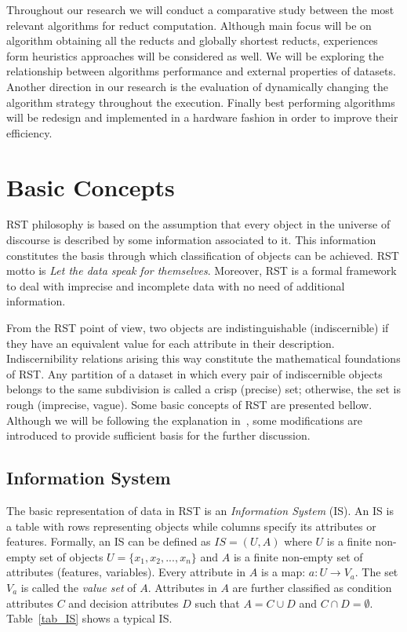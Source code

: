 \documentclass[authoryear,11pt]{elsarticle}
\begin{document}
  Throughout our research we will conduct a comparative study between the most relevant algorithms for reduct 
  computation. Although main focus will be on algorithm obtaining all the reducts and globally shortest reducts,
  experiences form heuristics approaches will be considered as well. We will be exploring the relationship 
  between algorithms performance and external properties of datasets. Another direction in our research is
  the evaluation of dynamically changing the algorithm strategy throughout the execution. Finally best
  performing algorithms will be redesign and implemented in a hardware fashion in order to improve their
  efficiency.  

\section{Basic Concepts}\label{basicConcepts}
  RST philosophy is based on the assumption that every object in the universe of discourse is described by 
  some information associated to it. This information constitutes the basis through which classification of 
  objects can be achieved. RST motto is \textit{Let the data speak for themselves}. Moreover, RST is a formal 
  framework to deal with imprecise and incomplete data with no need of additional information.
  
  From the RST point of view, two objects are indistinguishable (indiscernible) if they have an equivalent 
  value for each attribute in their description. Indiscernibility relations arising this way constitute the
  mathematical foundations of RST. Any partition of a dataset in which every pair of indiscernible objects
  belongs to the same subdivision is called a crisp (precise) set; otherwise, the set is rough (imprecise, 
  vague). Some basic concepts of RST are presented bellow. Although we will be following the explanation 
  in~\citep{Polkowski00}, some modifications are introduced to provide sufficient basis for the further 
  discussion.
  
\subsection{Information System}
  The basic representation of data in RST is an \emph{Information System} (IS). An IS is a table with rows
  representing objects while columns specify its attributes or features. Formally, an IS can be defined as 
  $IS=(U,A)$ where $U$ is a finite non-empty set of objects $U=\lbrace x_1,x_2,...,x_n\rbrace$ and $A$ is a 
  finite non-empty set
  of attributes (features, variables). Every attribute in $A$ is a map: $a: U \rightarrow V_a$. The set $V_a$ is
  called the \textit{value set} of $A$. Attributes in $A$ are further classified as condition attributes $C$ and 
  decision attributes $D$ such that $A=C \cup D$ and $C \cap D =\emptyset$. 
  Table~\ref{tab_IS} shows a typical IS.
  
\end{document}
